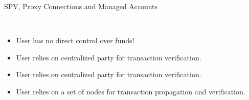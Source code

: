 \documentclass[]{beamer}
\begin{document}
\begin{frame}{SPV, Proxy Connections and Managed Accounts}

 \\ \vspace{1em}

	
	\begin{itemize}
		\item<2-> User has no direct control over funds!
		\item<2-> User relies on centralized party for transaction verification.
	\end{itemize}

	\vspace{1em}	
		
		
		\begin{itemize}
		\item<3-> User relies on centralized party for transaction verification.
	\end{itemize}		
	
	\vspace{1em}
	
	
	\begin{itemize}
		\item<4-> User relies on a set of nodes for transaction propagation and verification.

	\end{itemize}
	

	
\end{frame}
\end{document}
